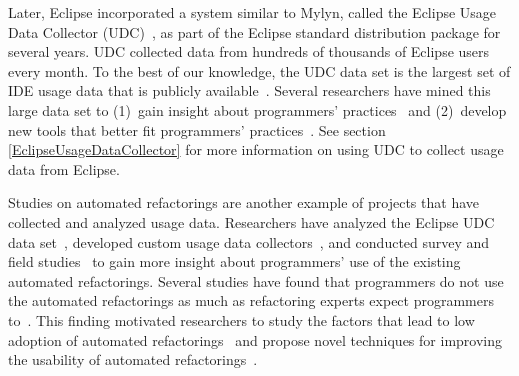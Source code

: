 %
Later, Eclipse incorporated a system similar to Mylyn, called the Eclipse Usage
Data Collector (UDC)~\cite{WebPageUDC}, as part of the Eclipse standard
distribution package for several years. UDC collected data from hundreds of
thousands of Eclipse users every month. To the best of our knowledge, the UDC
data set is the largest set of IDE usage data that is publicly
available~\cite{WebPageUDCArchive}. Several researchers have mined this large
data set to
%
(1)~gain insight about programmers'
practices~\cite{VakilianJohnson2014Alternate, VakilianETAL2013Compositional,
V:MurphyHill2012How} and
%
(2)~develop new tools that better fit programmers'
practices~\cite{MurphyHill2012Improving, VakilianETAL2013Compositional}.
See section \ref {EclipseUsageDataCollector} for more information on using UDC to collect usage data from Eclipse.

Studies on automated refactorings are another example of projects that have
collected and analyzed usage data. Researchers have analyzed the Eclipse UDC
data set~\cite{V:MurphyHill2012How, VakilianETAL2013Compositional}, developed
custom usage data collectors~\cite{VakilianETAL2012UseDisuseMisuse}, and
conducted survey and field studies~\cite{V:MurphyHill2012How,
VakilianJohnson2014Alternate, NegaraETAL2013ManualRefactorings} to gain more
insight about programmers' use of the existing automated refactorings. Several
studies have found that programmers do not use the automated refactorings as
much as refactoring experts expect programmers to~\cite{V:MurphyHill2012How,
NegaraETAL2013ManualRefactorings}. This finding motivated researchers to study
the factors that lead to low adoption of automated
refactorings~\cite{VakilianETAL2012UseDisuseMisuse, V:MurphyHill2012How} and
propose novel techniques for improving the usability of automated
refactorings~\cite{V:MurphyHill2012How, MurphyHill2012Improving,
MurphyHill2008ExtractMethod, LeeETAL2013DragDrop, MurphyHillETAL2011Gestures,
GeETAL2012BeneFactor, FosterETAL2012WitchDoctor}.
%
%

